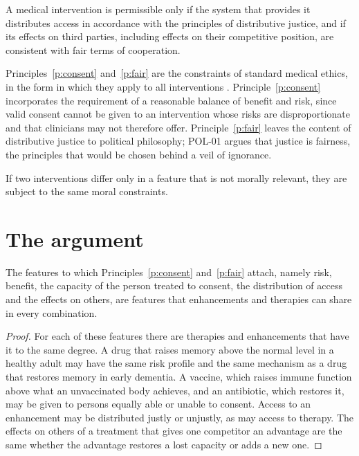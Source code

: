 \documentclass{situationist-preprint}
\begin{document}
\begin{principle}[Fairness]\label{p:fair}
A medical intervention is permissible only if the system that provides it distributes access in accordance with the principles of distributive justice, and if its effects on third parties, including effects on their competitive position, are consistent with fair terms of cooperation.
\end{principle}

Principles~\ref{p:consent} and~\ref{p:fair} are the constraints of standard medical ethics, in the form in which they apply to all interventions \citep{BeauchampChildress1979}. Principle~\ref{p:consent} incorporates the requirement of a reasonable balance of benefit and risk, since valid consent cannot be given to an intervention whose risks are disproportionate and that clinicians may not therefore offer. Principle~\ref{p:fair} leaves the content of distributive justice to political philosophy; POL-01 argues that justice is fairness, the principles that would be chosen behind a veil of ignorance.

\begin{principle}[Parity]\label{p:parity}
If two interventions differ only in a feature that is not morally relevant, they are subject to the same moral constraints.
\end{principle}

\section{The argument}

\begin{lemma}\label{l:shared}
The features to which Principles~\ref{p:consent} and~\ref{p:fair} attach, namely risk, benefit, the capacity of the person treated to consent, the distribution of access and the effects on others, are features that enhancements and therapies can share in every combination.
\end{lemma}

\begin{proof}
For each of these features there are therapies and enhancements that have it to the same degree. A drug that raises memory above the normal level in a healthy adult may have the same risk profile and the same mechanism as a drug that restores memory in early dementia. A vaccine, which raises immune function above what an unvaccinated body achieves, and an antibiotic, which restores it, may be given to persons equally able or unable to consent. Access to an enhancement may be distributed justly or unjustly, as may access to therapy. The effects on others of a treatment that gives one competitor an advantage are the same whether the advantage restores a lost capacity or adds a new one.
\end{proof}
\end{document}

